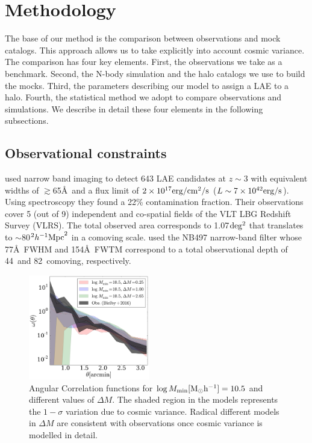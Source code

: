 \documentclass{emulateapj}
\newcommand{\hMpc}{{\ifmmode{h^{-1}{\rm Mpc}}\else{$h^{-1}$Mpc}\fi}}
\begin{document}
\section{Methodology}

The base of our method is the comparison between observations and mock
catalogs. 
This approach allows us to take explicitly into account cosmic variance. 
The comparison has four key elements. 
First, the observations we take as a benchmark. 
Second, the N-body simulation and the halo catalogs we use to build
the mocks. 
Third, the parameters describing our model to
assign a LAE to a halo. 
Fourth, the statistical method we adopt to compare observations and
simulations.  
We describe in detail these four elements in the following subsections.




\subsection{Observational constraints}
\label{subsec:obs}
\citet{Bielby16} used narrow band imaging to detect 643 LAE candidates
at $z\sim 3$  with equivalent widths of $\gtrsim$65\AA\ and a flux limit
of $2\times10^{17}{\rm erg/cm^2/s}$ ($L\sim 7\times10^{42}{\rm erg/s} $). 
Using spectroscopy they found a 22\% contamination fraction.
Their observations cover 5 (out of 9) independent and co-spatial
fields of the VLT LBG Redshift Survey (VLRS).  
The  total observed  area corresponds to 1.07$\rm deg^2$ that translates to
$\sim$80$^2\hMpc^2$ in a comoving scale. 
\citet{Bielby16} used the NB497  narrow-band filter whose 77\AA\ FWHM
and 154\AA\ FWTM correspond to a total observational depth of
44\hMpc\  and 82\hMpc\ comoving, respectively. 

\begin{figure}
  \includegraphics[width=0.47\textwidth]{fig5.pdf}
\caption{ Angular Correlation functions for $\log M_{\rm
    min}[\rm{M_{\odot}h^{-1}}]=10.5$ and different values of $\Delta
  M$.  
  The shaded region in the models represents the $1-\sigma$ variation
  due to cosmic variance. Radical different models in $\Delta M$ are consistent with
  observations once cosmic variance is modelled in detail.} 
\label{fig:corr}
\end{figure}
\end{document}
